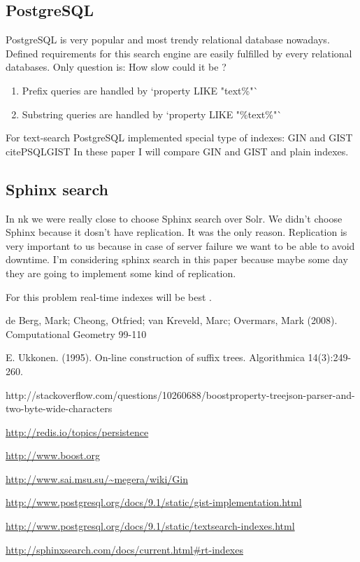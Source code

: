 \documentclass[10pt,a4paper]{article}
\begin{document}
\subsection{PostgreSQL}

PostgreSQL is very popular and most trendy relational database nowadays. Defined requirements for this search engine are easily fulfilled by every relational databases. Only question is: How slow could it be ?

\begin{enumerate}
\item Prefix queries are handled by `property LIKE "text\%"`
\item Substring queries are handled by `property LIKE "\%text\%"`
\end{enumerate}

For text-search PostgreSQL implemented special type of indexes: GIN \cite{PSQLGIN} and GIST cite{PSQLGIST} 
In these paper I will compare GIN and GIST and plain indexes.

\subsection{Sphinx search}

In nk we were really close to choose Sphinx search over Solr. We didn't choose Sphinx because it dosn't have replication. It was the only reason. Replication is very important to us because in case of server failure we want to be able to avoid downtime. I'm considering sphinx search in this paper because maybe some day they are going to implement some kind of replication.

For this problem real-time indexes will be best \cite{SPHINXRT} .


\begin{thebibliography}{99}

 de Berg, Mark; Cheong, Otfried; van Kreveld, Marc; Overmars, Mark (2008). Computational Geometry 99-110

 E. Ukkonen. (1995). On-line construction of suffix trees. Algorithmica 14(3):249-260.

 http://stackoverflow.com/questions/10260688/boostproperty-treejson-parser-and-two-byte-wide-characters

 \url{http://redis.io/topics/persistence}

 \url{http://www.boost.org}

 \url{http://www.sai.msu.su/~megera/wiki/Gin}

 \url{http://www.postgresql.org/docs/9.1/static/gist-implementation.html}

 \url{http://www.postgresql.org/docs/9.1/static/textsearch-indexes.html}

 \url{http://sphinxsearch.com/docs/current.html#rt-indexes}

\end{thebibliography}\
\end{document}
